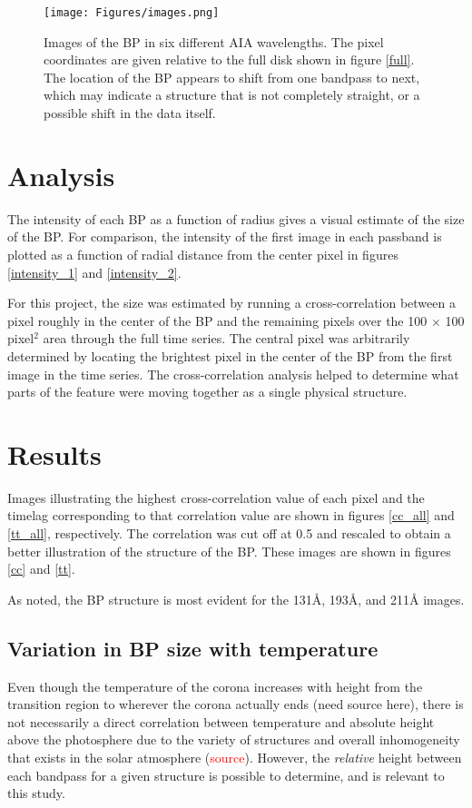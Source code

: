 \documentclass[preprint2]{aastex}
\begin{document}
\begin{figure}[htb!]
    \texttt{[image: Figures/images.png]}
    \caption{Images of the BP in six different AIA wavelengths. The pixel coordinates
        are given relative to the full disk shown in figure \ref{full}.
        The location of the BP appears to shift from one bandpass to next, which
        may indicate a structure that is not completely straight, or a possible shift
        in the data itself.}
    \label{bp_images}
\end{figure}

\section{Analysis}\label{analysis}
The intensity of each BP as a function of radius gives a visual estimate
of the size of the BP. For comparison, the intensity of the first image in each
passband is plotted as a function of radial distance from the center pixel in figures
\ref{intensity_1} and \ref{intensity_2}.

For this project, the size was estimated by running a cross-correlation between
a pixel roughly in the center of the BP and the remaining pixels over the
100 $\times$ 100 pixel$^{2}$ area through the full time series.
The central pixel was arbitrarily determined by locating the brightest pixel in the center
of the BP from the first image in the time series. The cross-correlation analysis
helped to determine what parts of the feature were moving together as a single
physical structure.

\section{Results}\label{results}

Images illustrating the highest cross-correlation value of each pixel and the
timelag corresponding to that correlation value are shown in figures \ref{cc_all}
and \ref{tt_all}, respectively. The correlation was cut off at 0.5 and rescaled to obtain a
better illustration of the structure of the BP. These images are shown in
figures \ref{cc} and \ref{tt}.

As \cite{Alipour} noted, the BP structure is most evident for the
131\AA{}, 193\AA{}, and 211\AA{} images.

\subsection{Variation in BP size with temperature}
Even though the temperature of the corona increases with height from the transition
region to wherever the corona actually ends (need source here), there is not necessarily
a direct correlation between temperature and absolute height above the photosphere
due to the variety of structures
and overall inhomogeneity that exists in the solar atmosphere (\textcolor{red}{source}).
However, the \emph{relative} height between each bandpass for a given structure is
possible to determine, and is relevant to this study.
\end{document}
